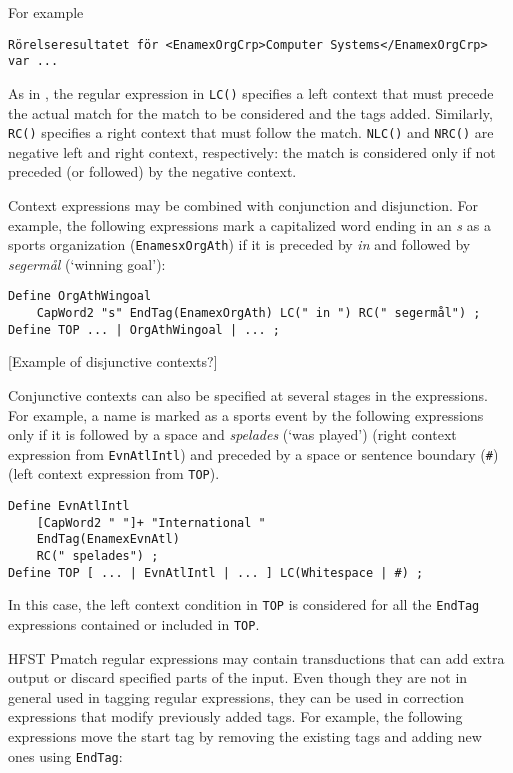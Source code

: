 \documentclass{llncs}
\begin{document}
\noindent
For example

\begin{verbatim}
Rörelseresultatet för <EnamexOrgCrp>Computer Systems</EnamexOrgCrp>
var ...
\end{verbatim}

As in \cite{karttunen/2011}, the regular expression in \texttt{LC()}
specifies a left context that must precede the actual match for the
match to be considered and the tags added. Similarly, \texttt{RC()}
specifies a right context that must follow the match. \texttt{NLC()}
and \texttt{NRC()} are negative left and right context, respectively:
the match is considered only if not preceded (or followed) by the
negative context.

Context expressions may be combined with conjunction and disjunction.
For example, the following expressions mark a capitalized word ending
in an \textit{s} as a sports organization (\texttt{EnamesxOrgAth}) if
it is preceded by \textit{in} and followed by \textit{segermål}
(`winning goal'):

\begin{verbatim}
Define OrgAthWingoal
    CapWord2 "s" EndTag(EnamexOrgAth) LC(" in ") RC(" segermål") ;
Define TOP ... | OrgAthWingoal | ... ;
\end{verbatim}

\textsf{[Example of disjunctive contexts?]}

Conjunctive contexts can also be specified at several stages in the
expressions. For example, a name is marked as a sports event by the
following expressions only if it is followed by a space and
\textit{spelades} (`was played') (right context expression from
\texttt{EvnAtlIntl}) and preceded by a space or sentence boundary
(\texttt{\#}) (left context expression from \texttt{TOP}).

\begin{verbatim}
Define EvnAtlIntl
    [CapWord2 " "]+ "International "
    EndTag(EnamexEvnAtl)
    RC(" spelades") ;
Define TOP [ ... | EvnAtlIntl | ... ] LC(Whitespace | #) ;
\end{verbatim}

\noindent
In this case, the left context condition in \texttt{TOP} is considered
for all the \texttt{EndTag} expressions contained or included in
\texttt{TOP}.

HFST Pmatch regular expressions may contain transductions that can add
extra output or discard specified parts of the input. Even though they
are not in general used in tagging regular expressions, they can be
used in correction expressions that modify previously added tags. For
example, the following expressions move the start tag by removing the
existing tags and adding new ones using \texttt{EndTag}:
\end{document}
